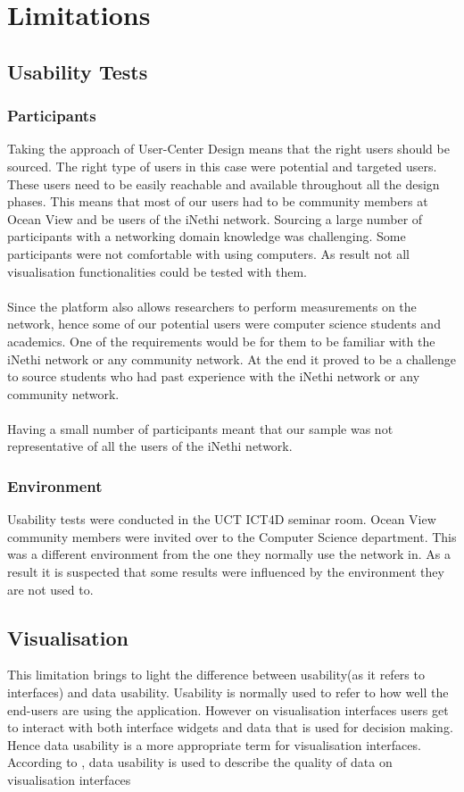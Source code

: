 \section{Limitations}
\subsection{Usability Tests}
\subsubsection{Participants}
Taking the approach of User-Center Design means that the right users should be sourced. The right type of users in this case were  potential and targeted users. These users need to be easily reachable and available throughout all the design phases. This means that most of our users had to be community members at Ocean View and be users of the iNethi network. Sourcing a large number of participants with a networking domain knowledge was challenging. Some participants were not comfortable with using computers. As result not all visualisation functionalities could be tested with them.
\paragraph{}
Since the platform also allows researchers to perform measurements on the network, hence some of our potential users were computer science students and academics. One of the requirements would be for them to be familiar with the iNethi network or any community network. At the end it proved to be a challenge to source students who had past experience with the iNethi network or any community network.
\paragraph{}
Having a small number of participants meant that our sample was not representative of all the users of the iNethi network.

\subsubsection{Environment}
Usability tests were conducted in the UCT ICT4D seminar room. Ocean View community members were invited over to the Computer Science department. This was a different environment from the one they normally use the network in. As a result it is suspected that some results were influenced by the environment they are not used to.
\subsection{Visualisation}
This limitation brings to light the difference between usability(as it refers to interfaces) and data usability. Usability is normally used to refer to how well the end-users are using the application\cite{Luciana}. However on visualisation interfaces users get to interact with both interface widgets and data that is used for decision making\cite{Luciana}. Hence data usability is a more appropriate term for visualisation interfaces. According to \cite{Luciana}, data usability is used to describe the quality of data on visualisation interfaces
